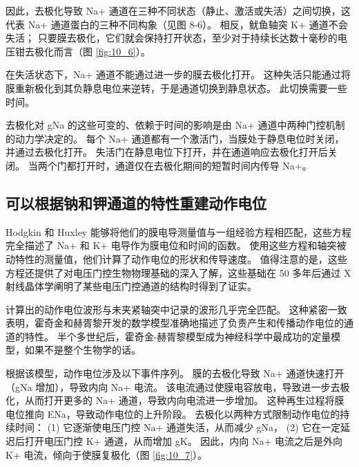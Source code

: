 因此，去极化导致 Na+ 通道在三种不同状态（静止、激活或失活）之间切换，这代表 Na+ 通道蛋白的三种不同构象（见图 8-6）。 
相反，鱿鱼轴突 K+ 通道不会失活； 只要膜去极化，它们就会保持打开状态，至少对于持续长达数十毫秒的电压钳去极化而言（图 \ref{fig:10_6}）。


在失活状态下，Na+ 通道不能通过进一步的膜去极化打开。 
这种失活只能通过将膜重新极化到其负静息电位来逆转，于是通道切换到静息状态。 
此切换需要一些时间。


去极化对 gNa 的这些可变的、依赖于时间的影响是由 Na+ 通道中两种门控机制的动力学决定的。 
每个 Na+ 通道都有一个激活门，当膜处于静息电位时关闭，并通过去极化打开。 
失活门在静息电位下打开，并在通道响应去极化打开后关闭。 
当两个门都打开时，通道仅在去极化期间的短暂时间内传导 Na+。



\subsection{可以根据钠和钾通道的特性重建动作电位}

Hodgkin 和 Huxley 能够将他们的膜电导测量值与一组经验方程相匹配，这些方程完全描述了 Na+ 和 K+ 电导作为膜电位和时间的函数。 
使用这些方程和轴突被动特性的测量值，他们计算了动作电位的形状和传导速度。 
值得注意的是，这些方程还提供了对电压门控生物物理基础的深入了解，这些基础在 50 多年后通过 X 射线晶体学阐明了某些电压门控通道的结构时得到了证实。


计算出的动作电位波形与未夹紧轴突中记录的波形几乎完全匹配。 
这种紧密一致表明，霍奇金和赫胥黎开发的数学模型准确地描述了负责产生和传播动作电位的通道的特性。 
半个多世纪后，霍奇金-赫胥黎模型成为神经科学中最成功的定量模型，如果不是整个生物学的话。


根据该模型，动作电位涉及以下事件序列。 
膜的去极化导致 Na+ 通道快速打开（gNa 增加），导致内向 Na+ 电流。 
该电流通过使膜电容放电，导致进一步去极化，从而打开更多的 Na+ 通道，导致内向电流进一步增加。 
这种再生过程将膜电位推向 ENa，导致动作电位的上升阶段。 
去极化以两种方式限制动作电位的持续时间：
(1) 它逐渐使电压门控 Na+ 通道失活，从而减少 gNa，
(2) 它在一定延迟后打开电压门控 K+ 通道，从而增加 gK。 
因此，内向 Na+ 电流之后是外向 K+ 电流，倾向于使膜复极化（图 \ref{fig:10_7}）。

